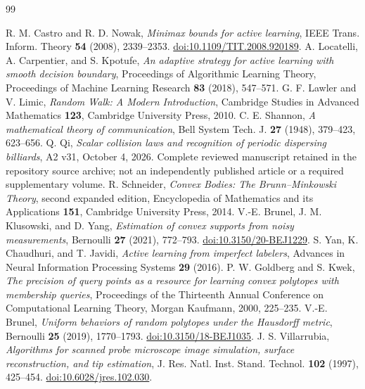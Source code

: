 \begin{thebibliography}{99}
\raggedright
{}
R. M. Castro and R. D. Nowak, \emph{Minimax bounds for active learning},
IEEE Trans. Inform. Theory \textbf{54} (2008), 2339--2353.
\href{https://doi.org/10.1109/TIT.2008.920189}{doi:10.1109/TIT.2008.920189}.
A. Locatelli, A. Carpentier, and S. Kpotufe,
\emph{An adaptive strategy for active learning with smooth decision boundary},
Proceedings of Algorithmic Learning Theory, Proceedings of Machine
Learning Research \textbf{83} (2018), 547--571.
G. F. Lawler and V. Limic, \emph{Random Walk: A Modern Introduction},
Cambridge Studies in Advanced Mathematics \textbf{123}, Cambridge
University Press, 2010.
C. E. Shannon, \emph{A mathematical theory of communication},
Bell System Tech. J. \textbf{27} (1948), 379--423, 623--656.
Q. Qi, \emph{Scalar collision laws and recognition of periodic dispersing
billiards}, A2 v31, October 4, 2026. Complete reviewed manuscript retained in the repository source archive;
not an independently published article or a required supplementary volume.
R. Schneider, \emph{Convex Bodies: The Brunn--Minkowski Theory},
second expanded edition, Encyclopedia of Mathematics and its Applications
\textbf{151}, Cambridge University Press, 2014.
V.-E. Brunel, J. M. Klusowski, and D. Yang,
\emph{Estimation of convex supports from noisy measurements},
Bernoulli \textbf{27} (2021), 772--793.
\href{https://doi.org/10.3150/20-BEJ1229}{doi:10.3150/20-BEJ1229}.
S. Yan, K. Chaudhuri, and T. Javidi,
\emph{Active learning from imperfect labelers},
Advances in Neural Information Processing Systems \textbf{29} (2016).
P. W. Goldberg and S. Kwek,
\emph{The precision of query points as a resource for learning convex
polytopes with membership queries},
Proceedings of the Thirteenth Annual Conference on Computational
Learning Theory, Morgan Kaufmann, 2000, 225--235.
V.-E. Brunel, \emph{Uniform behaviors of random polytopes under the
Hausdorff metric}, Bernoulli \textbf{25} (2019), 1770--1793.
\href{https://doi.org/10.3150/18-BEJ1035}{doi:10.3150/18-BEJ1035}.
J. S. Villarrubia, \emph{Algorithms for scanned probe microscope image
simulation, surface reconstruction, and tip estimation},
J. Res. Natl. Inst. Stand. Technol. \textbf{102} (1997), 425--454.
\href{https://doi.org/10.6028/jres.102.030}{doi:10.6028/jres.102.030}.
\end{thebibliography}
